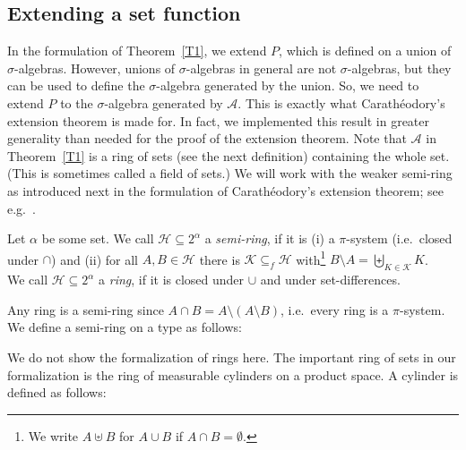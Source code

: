 \documentclass[lean]{AFM}
\begin{document}
\subsection{Extending a set function}
In the formulation of Theorem~\ref{T1}, we extend $P$, which is
defined on a union of $\sigma$-algebras. However, unions of
$\sigma$-algebras in general are not $\sigma$-algebras, but they can
be used to define the $\sigma$-algebra generated by the union. So, we
need to extend $P$ to the $\sigma$-algebra generated by $\mathcal
A$. This is exactly what Carathéodory's extension theorem is made
for. In fact, we implemented this result in greater generality than
needed for the proof of the extension theorem. Note that $\mathcal A$
in Theorem~\ref{T1} is a ring of sets (see the next definition)
containing the whole set. (This is sometimes called a field of sets.)
We will work with the weaker semi-ring as introduced next in the
formulation of Carathéodory's extension theorem; see
e.g.\ \cite[Definition~1.9]{Klenke2013}.

\begin{definition}\label{def:semi}
  Let $\alpha$ be some set. We call $\mathcal H \subseteq 2^\alpha$ a
  \emph{semi-ring}, if it is (i) a $\pi$-system (i.e.\ closed under
  $\cap$) and (ii) for all $A, B \in\mathcal H$ there is $\mathcal K
  \subseteq_f \mathcal H$ with\footnote{We write $A\uplus B$ for
    $A\cup B$ if $A\cap B=\emptyset$.}  $B\setminus A = \biguplus_{K
    \in \mathcal K} K$.  \\ We call $\mathcal H \subseteq 2^\alpha$ a
  \emph{ring}, if it is closed under $\cup$ and under set-differences.
\end{definition}

\noindent
Any ring is a semi-ring since $A\cap B = A \setminus (A \setminus B)$,
i.e.\ every ring is a $\pi$-system.
We define a semi-ring on a type  as follows:


\noindent
We do not show the formalization of rings here.
The important ring of sets in our formalization is the ring of measurable cylinders on a product space.
A cylinder is defined as follows:
\end{document}
